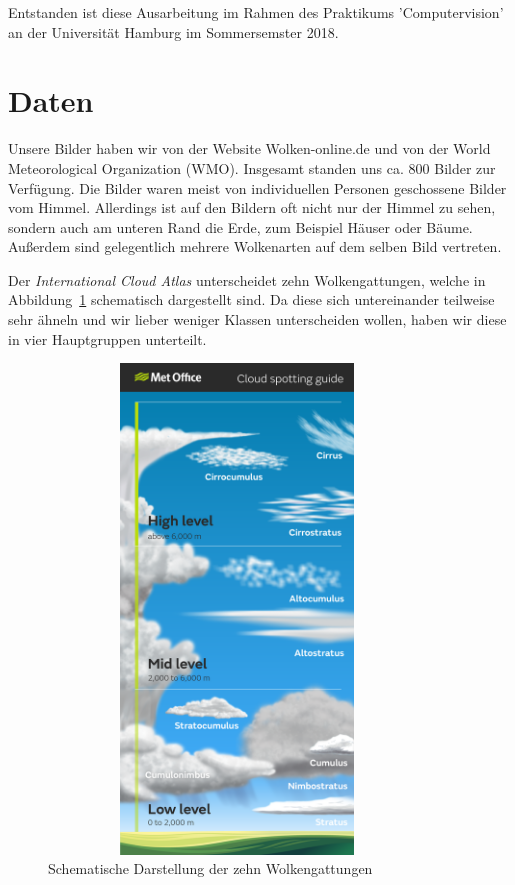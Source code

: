 \documentclass[a4,german]{article}
\begin{document}
Entstanden ist diese Ausarbeitung im Rahmen des Praktikums 'Computervision' an der Universität Hamburg im Sommersemster 2018.



\section{Daten}


Unsere Bilder haben wir von der Website Wolken-online.de und von der World Meteorological Organization (WMO).
Insgesamt standen uns ca. 800 Bilder zur Verfügung.
Die Bilder waren meist von individuellen Personen geschossene Bilder vom Himmel. 
Allerdings ist auf den Bildern oft nicht nur der Himmel zu sehen, sondern auch am unteren Rand die Erde, zum Beispiel Häuser oder Bäume. Außerdem sind gelegentlich mehrere Wolkenarten auf dem selben Bild vertreten.

Der \textit{International Cloud Atlas} unterscheidet zehn Wolkengattungen, welche in Abbildung~\ref{fig:cloudtypes} schematisch dargestellt sind. Da diese sich untereinander teilweise sehr ähneln und wir lieber weniger Klassen unterscheiden wollen, haben wir diese in vier Hauptgruppen unterteilt.

\begin{figure}[h!]
\centering
\includegraphics[width=10cm,height=13cm,keepaspectratio]{Cloud_infographic-01.png}
\caption{Schematische Darstellung der zehn Wolkengattungen}
    \label{fig:cloudtypes}
\end{figure}
\end{document}
